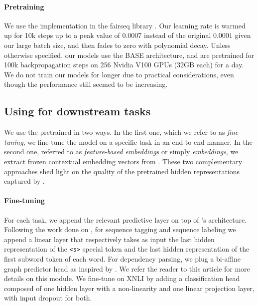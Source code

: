 \paragraph{Pretraining}
We use the \roberta implementation in the fairseq library \cite{ott-etal-2019-fairseq}.
Our learning rate is warmed up for 10k steps up to a peak value of $0.0007$ instead of the original $0.0001$ given our large batch size, and then fades to zero with polynomial decay.
Unless otherwise specified, our models use the BASE architecture, and are pretrained for 100k backpropagation steps on 256 Nvidia V100 GPUs (32GB each) for a day.
We do not train our models for longer due to practical considerations, even though the performance still seemed to be increasing.

\subsection{Using \camembert for downstream tasks}
We use the pretrained \camembert in two ways. In the first one, which we refer to as \textit{fine-tuning}, we fine-tune the model on a specific task in an end-to-end manner. In the second one, referred to as \textit{feature-based embeddings} or simply \textit{embeddings}, we extract frozen contextual embedding vectors from \camembert.
These two complementary approaches shed light on the quality of the pretrained hidden representations captured by \camembert.


\paragraph{Fine-tuning}
For each task, we append the relevant predictive layer on top of \camembert's  architecture. Following the work done on \bert \cite{devlin-etal-2019-bert}, for sequence tagging and sequence labeling we append a linear layer that respectively takes as input the last hidden representation of the \texttt{<s>} special token and the last hidden representation of the first subword token of each word.
For dependency parsing, we plug a bi-affine graph predictor head as inspired by \citet{dozat-manning-2017-deep}. We refer the reader to this article for more details on this module.
We fine-tune on XNLI by adding a classification head composed of one hidden layer with a non-linearity and one linear projection layer, with input dropout for both.

